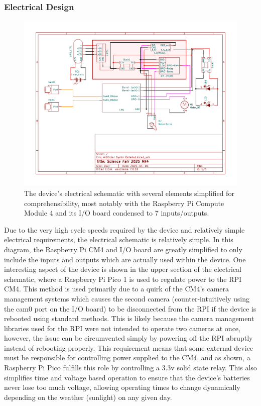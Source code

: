 \documentclass[fleqn,10pt]{SelfArx} %
\begin{document}
	\subsubsection{Electrical Design}
	\begin{figure}[h]
		\centering
		\includegraphics[width=1\linewidth]{Figures/ElecSchematic2}
		\caption[Electrical Schematic]{The device's electrical schematic with several elements simplified for comprehensibility, most notably with the Raspberry Pi Compute Module 4 and its I/O board condensed to 7 inputs/outputs.}
		\label{fig:ElecSchem}
	\end{figure}
	
	Due to the very high cycle speeds required by the device and relatively simple electrical requirements, the electrical schematic is relatively simple. In this diagram, the Raspberry Pi CM4 and I/O board are greatly simplified to only include the inputs and outputs which are actually used within the device. One interesting aspect of the device is shown in the upper section of the electrical schematic, where a Raspberry Pi Pico 1 is used to regulate power to the RPI CM4. This method is used primarily due to a quirk of the CM4’s camera management systems which causes the second camera (counter-intuitively using the cam0 port on the I/O board) to be disconnected from the RPI if the device is rebooted using standard methods. This is likely because the camera management libraries used for the RPI were not intended to operate two cameras at once, however, the issue can be circumvented simply by powering off the RPI abruptly instead of rebooting properly. This requirement means that some external device must be responsible for controlling power supplied to the CM4, and as shown, a Raspberry Pi Pico fulfills this role by controlling a 3.3v solid state relay. This also simplifies time and voltage based operation to ensure that the device’s batteries never lose too much voltage, allowing operating times to change dynamically depending on the weather (sunlight) on any given day. 
\end{document}
